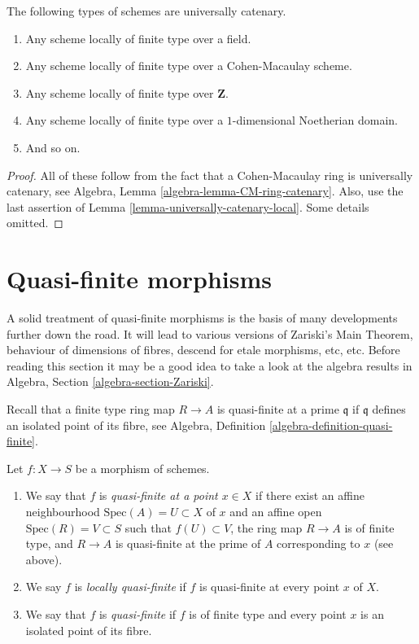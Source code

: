 \begin{lemma}
\label{lemma-ubiquity-uc}
The following types of schemes are universally catenary.
\begin{enumerate}
\item Any scheme locally of finite type over a field.
\item Any scheme locally of finite type over a Cohen-Macaulay scheme.
\item Any scheme locally of finite type over $\mathbf{Z}$.
\item Any scheme locally of finite type over a $1$-dimensional
Noetherian domain.
\item And so on.
\end{enumerate}
\end{lemma}

\begin{proof}
All of these follow from the fact that a
Cohen-Macaulay ring is universally catenary, see
Algebra, Lemma \ref{algebra-lemma-CM-ring-catenary}.
Also, use the last assertion of
Lemma \ref{lemma-universally-catenary-local}.
Some details omitted.
\end{proof}









\section{Quasi-finite morphisms}
\label{section-quasi-finite}

\noindent
A solid treatment of quasi-finite morphisms is the basis of many developments
further down the road. It will lead to various versions of Zariski's Main
Theorem, behaviour of dimensions of fibres, descend for etale morphisms, etc,
etc. Before reading this section it may be a good idea to take a look at
the algebra results in Algebra, Section \ref{algebra-section-Zariski}.

\medskip\noindent
Recall that a finite type ring map $R \to A$ is quasi-finite at
a prime $\mathfrak q$ if $\mathfrak q$ defines an isolated point
of its fibre, see Algebra, Definition \ref{algebra-definition-quasi-finite}.

\begin{definition}
\label{definition-quasi-finite}
Let $f : X \to S$ be a morphism of schemes.
\begin{enumerate}
\item We say that $f$ is {\it quasi-finite at a point $x \in X$}
if there exist an affine neighbourhood $\text{Spec}(A) = U \subset X$
of $x$ and an affine open $\text{Spec}(R) = V \subset S$ such that
$f(U) \subset V$, the ring map $R \to A$ is of finite type,
and $R \to A$ is quasi-finite at the prime of $A$ corresponding to $x$
(see above).
\item We say $f$ is {\it locally quasi-finite} if $f$ is
quasi-finite at every point $x$ of $X$.
\item We say that $f$ is {\it quasi-finite} if $f$ is of finite type
and every point $x$ is an isolated point of its fibre.
\end{enumerate}
\end{definition}

